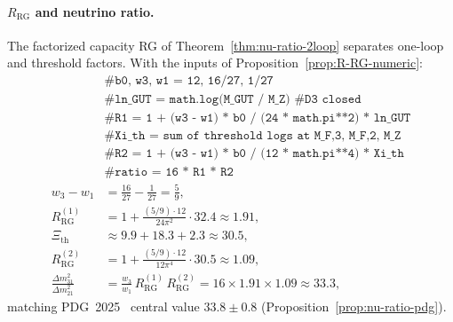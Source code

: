 \documentclass[11pt]{article}
\theoremstyle{plain}
\theoremstyle{definition}
\theoremstyle{remark}
\numberwithin{equation}{section}
\begin{document}
\paragraph{$R_{\mathrm{RG}}$ and neutrino ratio.}
The factorized capacity RG of Theorem~\ref{thm:nu-ratio-2loop} separates
one-loop and threshold factors. With the inputs of
Proposition~\ref{prop:R-RG-numeric}:
\begin{equation}\label{eq:workbook-R-RG}
\begin{aligned}
  &\texttt{\# b0, w3, w1 = 12, 16/27, 1/27}\\
  &\texttt{\# ln\_GUT = math.log(M\_GUT / M\_Z)  \# D3 closed}\\
  &\texttt{\# R1 = 1 + (w3 - w1) * b0 / (24 * math.pi**2) * ln\_GUT}\\
  &\texttt{\# Xi\_th = sum of threshold logs at M\_F,3, M\_F,2, M\_Z}\\
  &\texttt{\# R2 = 1 + (w3 - w1) * b0 / (12 * math.pi**4) * Xi\_th}\\
  &\texttt{\# ratio = 16 * R1 * R2}\\
  w_3-w_1 &= \frac{16}{27}-\frac{1}{27}=\frac{5}{9},\\
  R_{\mathrm{RG}}^{(1)}
  &= 1+\frac{(5/9)\cdot 12}{24\pi^2}\cdot 32.4
  \approx 1.91,\\
  \Xi_{\mathrm{th}} &\approx 9.9+18.3+2.3 \approx 30.5,\\
  R_{\mathrm{RG}}^{(2)}
  &= 1+\frac{(5/9)\cdot 12}{12\pi^4}\cdot 30.5
  \approx 1.09,\\
  \frac{\Delta m^2_{31}}{\Delta m^2_{21}}
  &= \frac{w_3}{w_1}\,R_{\mathrm{RG}}^{(1)}\,R_{\mathrm{RG}}^{(2)}
  = 16\times 1.91\times 1.09
  \approx 33.3,
\end{aligned}
\end{equation}
matching PDG~2025~\cite{PDG2025} central value $33.8\pm 0.8$
(Proposition~\ref{prop:nu-ratio-pdg}).
\end{document}
